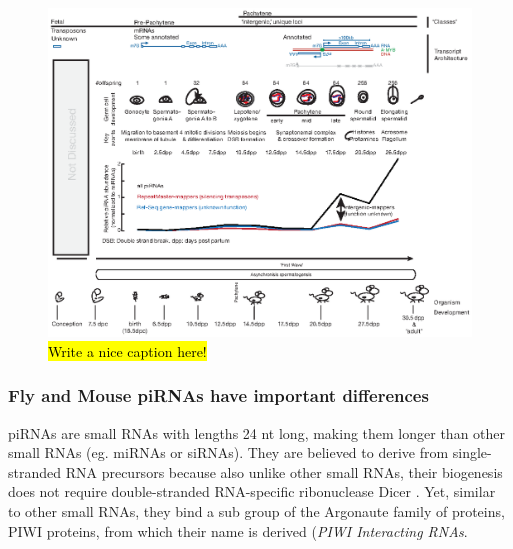       \begin{figure}[htbp] %
      \centering 
      \includegraphics{Figures/Chapter1/MammalianPiRNAClassesOverTime.eps}
      \caption[Different Classes of mammalian piRNAs]
      {
        \hl{Write a nice caption here!}
        } \label{fig:Mammalian piRNA classes}
      \end{figure}

    \subsubsection{Fly and Mouse piRNAs have important differences}

      piRNAs are small RNAs with lengths 24 nt long, making them longer than other small RNAs (eg. miRNAs or siRNAs). They are believed to derive from single-stranded RNA precursors because also unlike other small RNAs, their biogenesis does not require double-stranded RNA-specific ribonuclease Dicer \citep{Vagin2006, Houwing2007}. Yet, similar to other small RNAs, they bind a sub group of the Argonaute family of proteins, PIWI proteins, from which their name is derived (\textit{PIWI Interacting RNAs}. 

